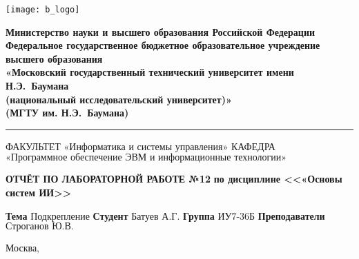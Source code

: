 \thispagestyle{empty}

\noindent \begin{minipage}{0.15\textwidth}
	\texttt{[image: b\_logo]}
\end{minipage}
\noindent\begin{minipage}{0.85\textwidth}\centering
	\textbf{Министерство науки и высшего образования Российской Федерации}\\
	\textbf{Федеральное государственное бюджетное образовательное учреждение высшего образования}\\
	\textbf{«Московский государственный технический университет имени Н.Э.~Баумана}\\
	\textbf{(национальный исследовательский университет)»}\\
	\textbf{(МГТУ им. Н.Э.~Баумана)}
\end{minipage}

\noindent\rule{\linewidth}{3pt}
\newline\newline
\noindent ФАКУЛЬТЕТ $\text{«Информатика и системы управления»}$ \newline\newline
\noindent КАФЕДРА $\text{«Программное обеспечение ЭВМ и информационные технологии»}$

\vspace{1cm}

\begin{center}
	\noindent\begin{minipage}{1\textwidth}
		\centering
		\Large\textbf{ОТЧЁТ ПО ЛАБОРАТОРНОЙ РАБОТЕ №12}\newline
		\textbf{по дисциплине <<«Основы систем ИИ>>}\newline\newline
	\end{minipage}
\end{center}

\noindent\textbf{Тема} $\text{Подкрепление}$\newline\newline
\noindent\textbf{Студент} $\text{Батуев А.Г.}$\newline\newline
\noindent\textbf{Группа} $\text{ИУ7-36Б}$\newline\newline
\noindent\textbf{Преподаватели} $\text{Строганов Ю.В.}$\newline

\begin{center}
	\vfill
	Москва,~\the\year
\end{center}
\clearpage
